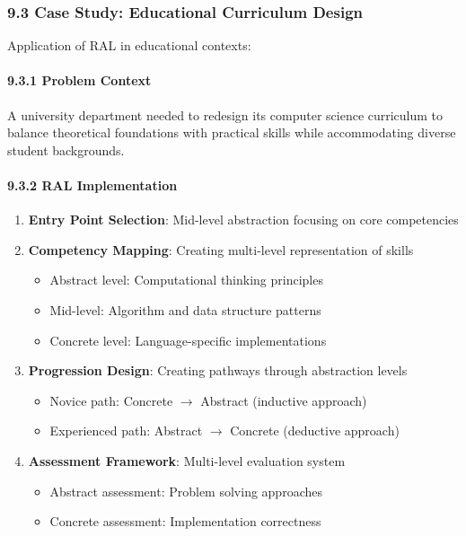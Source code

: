 \documentclass[
]{article}
\providecommand{\tightlist}{%
  \setlength{\itemsep}{0pt}\setlength{\parskip}{0pt}}
\begin{document}
\subsubsection{9.3 Case Study: Educational Curriculum
Design}\label{case-study-educational-curriculum-design}

Application of RAL in educational contexts:

\paragraph{9.3.1 Problem Context}\label{problem-context-2}

A university department needed to redesign its computer science
curriculum to balance theoretical foundations with practical skills
while accommodating diverse student backgrounds.

\paragraph{9.3.2 RAL Implementation}\label{ral-implementation-2}

\begin{enumerate}
\def\labelenumi{\arabic{enumi}.}
\tightlist
\item
  \textbf{Entry Point Selection}: Mid-level abstraction focusing on core
  competencies
\item
  \textbf{Competency Mapping}: Creating multi-level representation of
  skills

  \begin{itemize}
  \tightlist
  \item
    Abstract level: Computational thinking principles
  \item
    Mid-level: Algorithm and data structure patterns
  \item
    Concrete level: Language-specific implementations
  \end{itemize}
\item
  \textbf{Progression Design}: Creating pathways through abstraction
  levels

  \begin{itemize}
  \tightlist
  \item
    Novice path: Concrete \(\to \) Abstract (inductive approach)
  \item
    Experienced path: Abstract \(\to \) Concrete (deductive approach)
  \end{itemize}
\item
  \textbf{Assessment Framework}: Multi-level evaluation system

  \begin{itemize}
  \tightlist
  \item
    Abstract assessment: Problem solving approaches
  \item
    Concrete assessment: Implementation correctness
  \end{itemize}
\end{enumerate}
\end{document}
